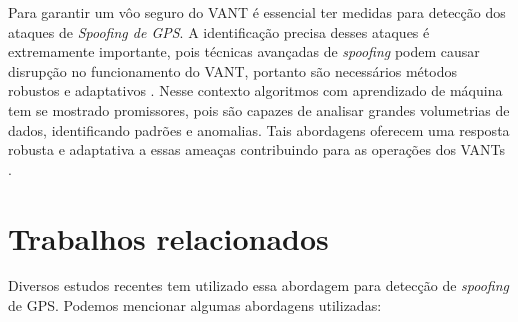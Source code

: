 \documentclass[12pt]{article}
\begin{document}
Para garantir um vôo seguro do VANT é essencial ter medidas para detecção dos ataques de \textit{Spoofing de GPS}.
A identificação precisa desses ataques é extremamente importante, pois técnicas avançadas de \textit{spoofing}
podem causar disrupção no funcionamento do VANT, portanto são necessários métodos robustos e adaptativos \cite{isleyenGPSSpoofingDetection2024}.
Nesse contexto algoritmos com aprendizado de máquina tem se mostrado promissores, pois são capazes de analisar
grandes volumetrias de dados, identificando padrões e anomalias. Tais abordagens oferecem uma resposta robusta e adaptativa a essas ameaças contribuindo para as operações dos VANTs \cite{isleyenGPSSpoofingDetection2024}.

\section{Trabalhos relacionados}

Diversos estudos recentes tem utilizado
essa abordagem para detecção de \textit{spoofing} de GPS.
Podemos mencionar algumas abordagens utilizadas:
\end{document}
